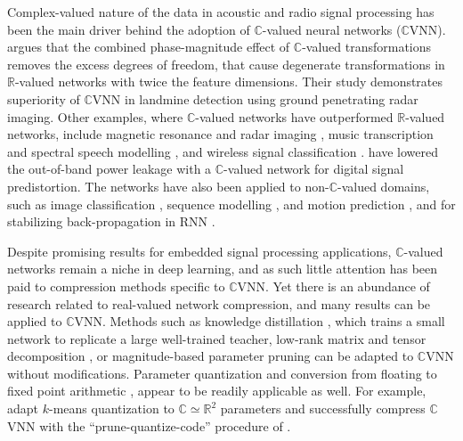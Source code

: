 \documentclass[a4paper,10pt,twocolumn]{article}
\newcommand{\real}{\mathbb{R}}
\newcommand{\cplx}{\mathbb{C}}
\begin{document}
Complex-valued nature of the data in acoustic and radio signal processing has been
the main driver behind the adoption of $\cplx$-valued neural networks ($\cplx$VNN).
\citet{hirose_complex-valued_2009} argues that the combined phase-magnitude effect of
$\cplx$-valued transformations removes the excess degrees of freedom, that cause
degenerate transformations in $\real$-valued networks with twice the feature dimensions.
Their study demonstrates superiority of $\cplx$VNN in landmine detection using ground
penetrating radar imaging. Other examples, where $\cplx$-valued networks have outperformed
$\real$-valued networks, include magnetic resonance \citep{hui_mri_1995,wang_deepcomplexmri_2020}
and radar imaging \citep{haensch_complex-valued_2010,zhang_complex-valued_2017}, music
transcription and spectral speech modelling \citep{wisdom_full-capacity_2016,trabelsi_deep_2018},
and wireless signal classification \citep{yang_complex_2020}. \citet{tarver_design_2019}
have lowered the out-of-band power leakage with a $\cplx$-valued network for digital
signal predistortion. The networks have also been applied to non-$\cplx$-valued domains,
such as image classification \citep{popa_complex-valued_2017}, sequence modelling
\citep{danihelka_associative_2016}, and motion prediction \citep{wolter_complex_2018},
and for stabilizing back-propagation in RNN \citep{wisdom_full-capacity_2016}.

Despite promising results for embedded signal processing applications, $\cplx$-valued
networks remain a niche in deep learning, and as such little attention has been paid
to compression methods specific to $\cplx$VNN.
%
Yet there is an abundance of research related to real-valued network compression, and
many results can be applied to $\cplx$VNN. Methods such as knowledge distillation
\citep{hinton_distilling_2015}, which trains a small network to replicate a large
well-trained teacher, low-rank matrix \citep{denton_exploiting_2014} and tensor decomposition
\citep{novikov_tensorizing_2015}, or magnitude-based parameter pruning \citep{zhu_prune_2018}
can be adapted to $\cplx$VNN without modifications. Parameter quantization and conversion
from floating to fixed point arithmetic \citep{courbariaux_training_2015,uhlich_mixed_2020},
appear to be readily applicable as well. For example, \citet{wu_compressing_2019} adapt
$k$-means quantization to $\cplx \simeq \real^2$ parameters and successfully compress
$\cplx$VNN with the ``prune-quantize-code'' procedure of \citet{han_deep_2016}.
\end{document}
